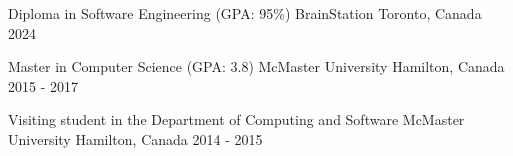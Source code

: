 \begin{cventries}
	\cvedu
	{Diploma in Software Engineering (GPA: 95\%)}
	{BrainStation}
	{Toronto, Canada}
	{2024}
	
	\cvedu
    {Master in Computer Science (GPA: 3.8)}
    {McMaster University}
    {Hamilton, Canada}
    {2015 - 2017}
   
    \cvedu
    {Visiting student in the Department of Computing and Software}
    {McMaster University}
    {Hamilton, Canada}
    {2014 - 2015}
    
    
   
  

\end{cventries}